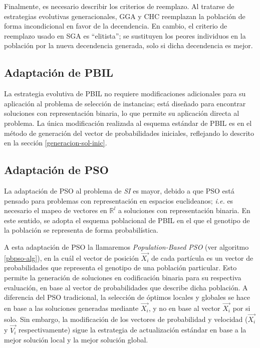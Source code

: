 Finalmente, es necesario describir los criterios de reemplazo. Al tratarse de estrategias evolutivas generacionales, GGA y CHC reemplazan la población de forma incondicional en favor de la decendencia. En cambio, el criterio de reemplazo usado en SGA es ``elitista''; se sustituyen los peores individuos en la población por la nueva decendencia generada, solo si dicha decendencia es mejor.

\subsection{Adaptación de PBIL}

La estrategia evolutiva de PBIL no requiere modificaciones adicionales para su aplicación al problema de selección de instancias; está diseñado para encontrar soluciones con representación binaria, lo que permite su aplicación directa al problema. La única modificación realizada al esquema estándar de PBIL es en el método de generación del vector de probabilidades iniciales, reflejando lo descrito en la sección \ref{generacion-sol-inic}.

\subsection{Adaptación de PSO}

La adaptación de PSO al problema de \emph{SI} es mayor, debido a que PSO está pensado para problemas con representación en espacios euclideanos; \emph{i.e.} es necesario el mapeo de vectores en $\mathbb{R}^l$ a soluciones con representación binaria. En este sentido, se adopta el esquema poblacional de PBIL en el que el genotipo de la población se representa de forma probabilística.

A esta adaptación de PSO la llamaremos \emph{Population-Based PSO} (ver algoritmo \ref{pbpso-alg}), en la cuál el vector de posición $\vec{X_i}$ de cada partícula es un vector de probabilidades que representa el genotipo de una población particular. Esto permite la generación de soluciones en codificación binaria para su respectiva evaluación, en base al vector de probabilidades que describe dicha población. A diferencia del PSO tradicional, la selección de óptimos locales y globales se hace en base a las soluciones generadas mediante $\vec{X_i}$, y no en base al vector $\vec{X_i}$ por si solo. Sin embargo, la modificación de los vectores de probabilidad y velocidad ($\vec{X_i}$ y $\vec{V_i}$ respectivamente) sigue la estrategia de actualización estándar en base a la mejor solución local y la mejor solución global.

